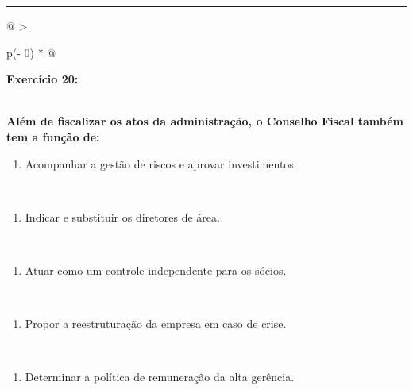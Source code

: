 \documentclass[
]{book}
\providecommand{\tightlist}{%
  \setlength{\itemsep}{0pt}\setlength{\parskip}{0pt}}
\begin{document}
\begin{center}\rule{0.5\linewidth}{0.5pt}\end{center}

\begin{longtable}[]{@{}
  >{\raggedright\arraybackslash}p{(\columnwidth - 0\tabcolsep) * }@{}}
\toprule\noalign{}
\begin{minipage}[b]{\linewidth}\raggedright
\textbf{Exercício 20:}
\end{minipage} \\
\midrule\noalign{}
\endhead
\bottomrule\noalign{}
\endlastfoot
\textbf{Além de fiscalizar os atos da administração, o Conselho Fiscal também tem a função de:} \\
\begin{minipage}[t]{\linewidth}\raggedright
\begin{enumerate}
\def\labelenumi{\alph{enumi})}
\tightlist
\item
  Acompanhar a gestão de riscos e aprovar investimentos.
\end{enumerate}
\end{minipage} \\
\begin{minipage}[t]{\linewidth}\raggedright
\begin{enumerate}
\def\labelenumi{\alph{enumi})}
\setcounter{enumi}{1}
\tightlist
\item
  Indicar e substituir os diretores de área.
\end{enumerate}
\end{minipage} \\
\begin{minipage}[t]{\linewidth}\raggedright
\begin{enumerate}
\def\labelenumi{\alph{enumi})}
\setcounter{enumi}{2}
\tightlist
\item
  Atuar como um controle independente para os sócios.
\end{enumerate}
\end{minipage} \\
\begin{minipage}[t]{\linewidth}\raggedright
\begin{enumerate}
\def\labelenumi{\alph{enumi})}
\setcounter{enumi}{3}
\tightlist
\item
  Propor a reestruturação da empresa em caso de crise.
\end{enumerate}
\end{minipage} \\
\begin{minipage}[t]{\linewidth}\raggedright
\begin{enumerate}
\def\labelenumi{\alph{enumi})}
\setcounter{enumi}{4}
\tightlist
\item
  Determinar a política de remuneração da alta gerência.
\end{enumerate}
\end{minipage} \\
\end{longtable}
\end{document}
